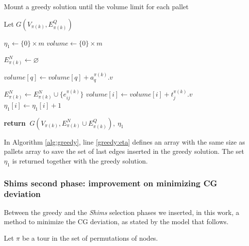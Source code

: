 \documentclass[preprint,authoryear]{elsarticle}
\renewcommand{\Return}{\State \bf {return}~}
\begin{document}
\begin{algorithm}[H]
	\caption{Mount a greedy solution until the volume limit for each pallet}  \label{alg:greedy}
	
	\begin{algorithmic}[1]
		
		
		\State Let $G(V_{\pi(k)}, E^Q_{\pi(k)})$
		
		\State $\eta_1 \gets \{0\} \times m$ \label{greedy:eta}
		\State $volume \gets \{0\} \times m$
		
		\State $E^N_{\pi(k)} \gets \varnothing$ 			
		
		\State $volume[q] \gets volume[q] + a_q^{\pi(k)}.v$ 
		\EndIf		
		\EndFor
		
		\State $E^N_{\pi(k)} \gets E^N_{\pi(k)} \cup \{e_{ij}^{\pi(k)}\}$ 
		\State $volume[i] \gets volume[i] + t_j^{\pi(k)}.v$
		\State $\eta_1[i] \gets \eta_1[i] + 1$ 	
		\EndIf
		\EndFor
		
		\Return $G(V_{\pi(k)}, E^N_{\pi(k)} \cup E^Q_{\pi(k)}),\ \eta_1$ 
		
		\EndProcedure
		
	\end{algorithmic}
\end{algorithm}

In Algorithm \ref{alg:greedy}, line \ref{greedy:eta} defines an array with the same size as pallets array to save the set of last edges inserted in the greedy solution. The set $\eta_1$ is returned together with the greedy solution.



\subsubsection{Shims second phase: improvement on minimizing CG deviation}

Between the greedy and the {\it Shims} selection phases we inserted, in this work, a method to minimize the CG deviation, as stated by the model that follows.

Let $\pi$ be a tour in the set of permutations of nodes.
\end{document}
